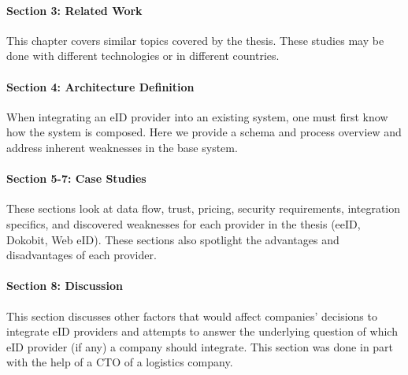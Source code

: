 \paragraph{Section 3: Related Work} This chapter covers similar topics covered by the thesis. These studies may be done with different technologies or in different countries.
\paragraph{Section 4: Architecture Definition} When integrating an eID provider into an existing system, one must first know how the system is composed. Here we provide a schema and process overview and address inherent weaknesses in the base system.
\paragraph{Section 5-7: Case Studies} These sections look at data flow, trust, pricing, security requirements, integration specifics, and discovered weaknesses for each provider in the thesis (eeID, Dokobit, Web eID). These sections also spotlight the advantages and disadvantages of each provider.
\paragraph{Section 8: Discussion} This section discusses other factors that would affect companies' decisions to integrate eID providers and attempts to answer the underlying question of which eID provider (if any) a company should integrate. This section was done in part with the help of a CTO of a logistics company.